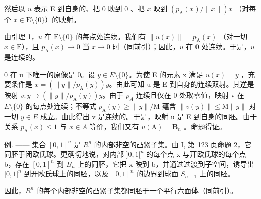 然后以 \(u\) 表示 E 到自身的、把 0 映到 0 、把 \(x\) 映到 \((p_{\mathrm{A}}(x) / \| x\|)x\) （对每个 \(x \in \mathrm{E}\setminus\{0\}\)）的映射。

由引理 1，\(u\) 在 \(\mathrm{E}\setminus\{0\}\) 的每点处连续。我们有 \(\| u(x)\| = p_{\mathrm{A}}(x)\) （对一切 \(x\in \mathrm{E}\)），且 \(p_{\mathrm{A}}(x)\to 0\) 当 \(x\to 0\) 时（同前引）；因此，\(u\) 在 0 处连续。于是，\(u\) 是连续的。

0 在 u 下唯一的原像是 0。设 \(y \in E\setminus\{0\}\)。为使 E 的元素 x 满足 \(u(x) = y\) ，充要条件是 \(x = (\|y\| / p_{\mathrm{A}}(y))y\)。由此可知 u 是 E 到自身的连续双射。其逆是映射 \(v: y \mapsto (\|y\| / p_{\mathrm{A}}(y))y\)。由于 \(p_{A}\) 连续且仅在 0 处取零值，映射 v 在 \(E\setminus\{0\}\) 的每点处连续；不等式 \(p_{\mathrm{A}}(y) \geqslant \|y\| / \mathrm{M}\) 蕴含 \(\|v(y)\| \leqslant \mathrm{M}\|y\|\) 对一切 \(y \in E\) 成立。由此得出 v 是连续的。于是，映射 u 是 E 到自身的同胚。由于关系 \(p_{\mathrm{A}}(x) \leqslant 1\) 与 \(x \in A\) 等价，我们又有 \(u(\mathrm{A}) = \mathbf{B}_{n}\) 。命题得证。

例. —— 集合 \([0,1]^{n}\) 是 \(R^{n}\) 的内部非空的凸紧子集。由 I, 第 123 页命题 2，它同胚于闭欧氏球。更确切地说，对内部 \(]0,1[^{n}\) 的每个点 x 与开欧氏球的每个点 b，存在 \([0,1]^{n}\) 到 \(B_{n}\) 上的同胚，它把 x 映到 b，并通过过渡到子空间，诱导出 \(]0,1[^{n}\) 到开欧氏球上的同胚，以及 \([0,1]^{n}\) 的边界到球面 \(S_{n-1}\) 上的同胚。

因此，\(R^{n}\) 的每个内部非空的凸紧子集都同胚于一个平行六面体（同前引）。

